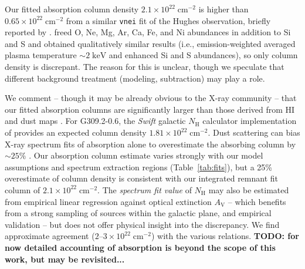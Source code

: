 \documentclass[preprint2,tighten,trackchanges]{aastex6}
\newcommand*{\mt}{\mathrm}
\newcommand*{\unit}[1]{\;\mt{#1}}  %
\newcommand*{\abt}{\mathord{\sim}} %
\newcommand*{\nH}{N_{\mathrm{H}}}
\newcommand*{\nHUnits}{\times 10^{22} \unit{cm^{-2}}}
\newcommand*{\AV}{A_{\mathrm{V}}}
\begin{document}

Our fitted absorption column density $2.1 \times 10^{22} \unit{cm^{-2}}$ is
higher than $0.65 \times 10^{22} \unit{cm^{-2}}$ from a similar \texttt{vnei}
fit of the Hughes observation, briefly reported by \citet{safi-harb2007}.
\citet{safi-harb2007} freed O, Ne, Mg, Ar, Ca, Fe, and Ni abundances in
addition to Si and S and obtained qualitatively similar results (i.e.,
emission-weighted averaged plasma temperature $\abt 2 \unit{keV}$ and enhanced
Si and S abundances), so only column density is discrepant.
The reason for this is unclear, though we speculate that different background
treatment (modeling, subtraction) may play a role.

We comment -- though it may be already obvious to the X-ray community -- that
our fitted absorption columns are significantly larger than those derived from
HI and dust maps \citep[e.g.,][]{willingale2013}.
For G309.2-0.6, the \textit{Swift} galactic $\nH$ calculator implementation of
\citet{willingale2013} provides an expected column density $1.81 \nHUnits$.
Dust scattering can bias X-ray spectrum fits of absorption alone to
overestimate the absorbing column by $\abt25\%$ \citep{corrales2016}.
Our absorption column estimate varies strongly with our model assumptions and
spectrum extraction regions (Table~\ref{tab:fits}), but a 25\% overestimate of
column density is consistent with our integrated remnant fit column of $2.1
\nHUnits$.
The \textit{spectrum fit value} of $\nH$ may also be estimated from empirical
linear regression against optical extinction $\AV$ \citep[e.g.,][]{foight2015}
-- which benefits from a strong sampling of sources within the galactic plane,
and empirical validation -- but does not offer physical insight into the
discrepancy. We find approximate agreement ($2$--$3 \nHUnits$) with the various
relations.
\textbf{TODO: for now detailed accounting of absorption is beyond the scope of
this work, but may be revisited...}
\end{document}
